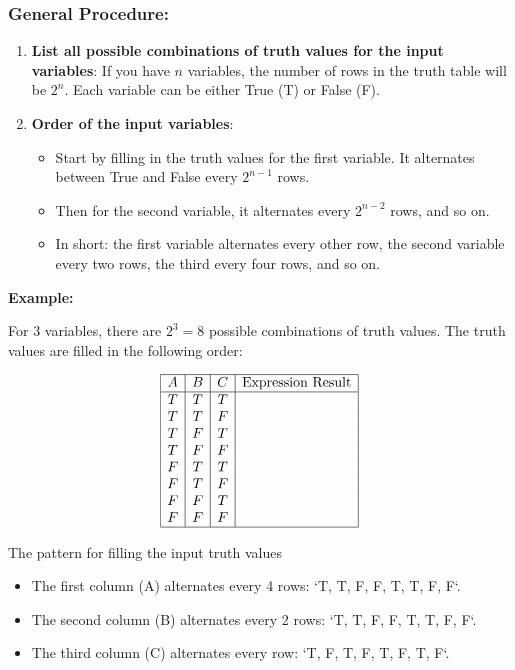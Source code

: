 \subsubsection{General Procedure:}
\begin{enumerate}
	\item \textbf{List all possible combinations of truth values for the input variables}: If you have \(n\) variables, the number of rows in the truth table will be \(2^n\). Each variable can be either True (T) or False (F).

	\item \textbf{Order of the input variables}:
	      \begin{itemize}[label=\(-\)]
		      \item Start by filling in the truth values for the first variable. It alternates between True and False every \(2^{n-1}\) rows.
		      \item Then for the second variable, it alternates every \(2^{n-2}\) rows, and so on.
		      \item In short: the first variable alternates every other row, the second variable every two rows, the third every four rows, and so on.
	      \end{itemize}
\end{enumerate}

\textbf{Example: } 

For 3 variables, there are \(2^3 = 8\) possible combinations of truth values. The truth values are filled in the following order:

\[
	\begin{array}{|c|c|c|c|}
		\hline
		A & B & C & \text{Expression Result} \\
		\hline
		T & T & T &                          \\
		T & T & F &                          \\
		T & F & T &                          \\
		T & F & F &                          \\
		F & T & T &                          \\
		F & T & F &                          \\
		F & F & T &                          \\
		F & F & F &                          \\
		\hline
	\end{array}
\]

The pattern for filling the input truth values
\begin{itemize}[label=\(-\)]
	\item The first column (A) alternates every 4 rows: `T, T, F, F, T, T, F, F`.
	\item The second column (B) alternates every 2 rows: `T, T, F, F, T, T, F, F`.
	\item The third column (C) alternates every row: `T, F, T, F, T, F, T, F`.
\end{itemize}


